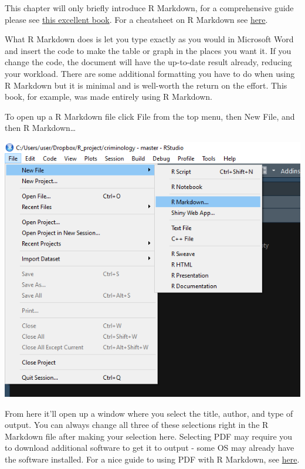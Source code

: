 \documentclass[
  12pt,
]{book}
\begin{document}
This chapter will only briefly introduce R Markdown, for a comprehensive guide please see \href{https://bookdown.org/yihui/rmarkdown/}{this excellent book}. For a cheatsheet on R Markdown see \href{https://www.rstudio.com/wp-content/uploads/2015/02/rmarkdown-cheatsheet.pdf}{here}.

What R Markdown does is let you type exactly as you would in Microsoft Word and insert the code to make the table or graph in the places you want it. If you change the code, the document will have the up-to-date result already, reducing your workload. There are some additional formatting you have to do when using R Markdown but it is minimal and is well-worth the return on the effort. This book, for example, was made entirely using R Markdown.

To open up a R Markdown file click File from the top menu, then New File, and then R Markdown\ldots{}

\includegraphics{images/markdown1.png}

From here it'll open up a window where you select the title, author, and type of output. You can always change all three of these selections right in the R Markdown file after making your selection here. Selecting PDF may require you to download additional software to get it to output - some OS may already have the software installed. For a nice guide to using PDF with R Markdown, see \href{https://medium.com/@sorenlind/create-pdf-.reports-using-r-r-markdown-latex-and-knitr-on-windows-10-952b0c48bfa9}{here}.
\end{document}
